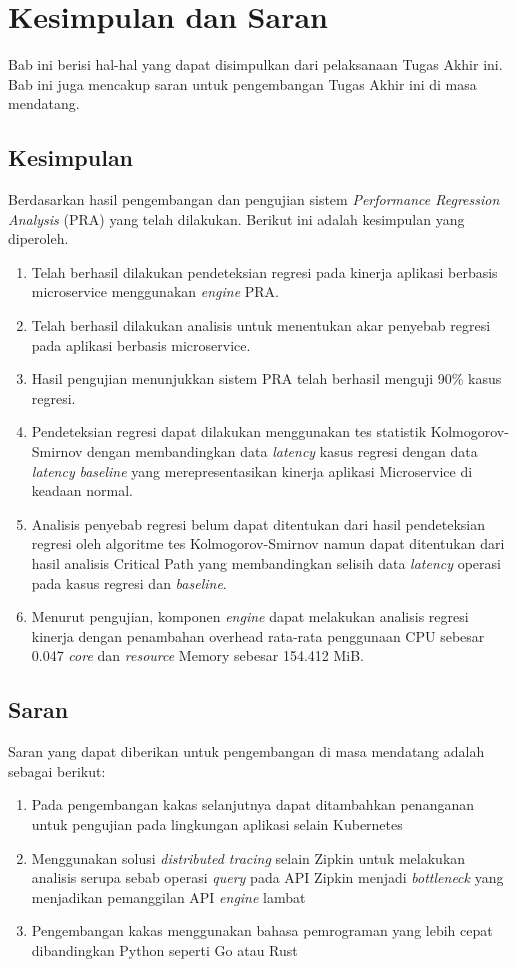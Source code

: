 \chapter{Kesimpulan dan Saran}
Bab ini berisi hal-hal yang dapat disimpulkan dari pelaksanaan Tugas Akhir ini. Bab ini juga mencakup saran untuk pengembangan Tugas Akhir ini di masa mendatang.

\section{Kesimpulan}
Berdasarkan hasil pengembangan dan pengujian sistem \textit{Performance Regression Analysis} (PRA) yang telah dilakukan. Berikut ini adalah kesimpulan yang diperoleh.
\begin{enumerate}
	\item Telah berhasil dilakukan pendeteksian regresi pada kinerja aplikasi berbasis microservice menggunakan \textit{engine} PRA.
	\item Telah berhasil dilakukan analisis untuk menentukan akar penyebab regresi pada aplikasi berbasis microservice.
	\item Hasil pengujian menunjukkan sistem PRA telah berhasil menguji 90\% kasus regresi.
	\item Pendeteksian regresi dapat dilakukan menggunakan tes statistik Kolmogorov-Smirnov dengan membandingkan data \textit{latency} kasus regresi dengan data \textit{latency} \textit{baseline} yang merepresentasikan kinerja aplikasi Microservice di keadaan normal.
	\item Analisis penyebab regresi belum dapat ditentukan dari hasil pendeteksian regresi oleh algoritme tes Kolmogorov-Smirnov namun dapat ditentukan dari hasil analisis Critical Path yang membandingkan selisih data \textit{latency} operasi pada kasus regresi dan \textit{baseline}.
	\item Menurut pengujian, komponen \textit{engine} dapat melakukan analisis regresi kinerja dengan penambahan overhead rata-rata penggunaan CPU sebesar 0.047 \textit{core} dan \textit{resource} Memory sebesar 154.412 MiB.
\end{enumerate}

\section{Saran}
Saran yang dapat diberikan untuk pengembangan di masa mendatang adalah sebagai berikut:
\begin{enumerate}
	\item Pada pengembangan kakas selanjutnya dapat ditambahkan penanganan untuk pengujian pada lingkungan aplikasi selain Kubernetes
	\item Menggunakan solusi \textit{distributed tracing} selain Zipkin untuk melakukan analisis serupa sebab operasi \textit{query} pada API Zipkin menjadi \textit{bottleneck} yang menjadikan pemanggilan API \textit{engine} lambat
	\item Pengembangan kakas menggunakan bahasa pemrograman yang lebih cepat dibandingkan Python seperti Go atau Rust
\end{enumerate}